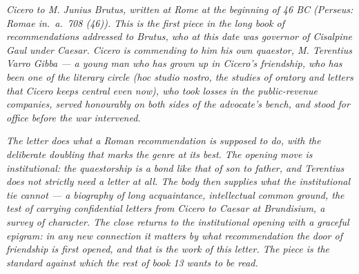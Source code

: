 
\textit{Cicero to M. Junius Brutus, written at Rome at the
beginning of 46 BC (Perseus: \textit{Romae in.~a.~708 (46)}).
This is the first piece in the long book of recommendations
addressed to Brutus, who at this date was governor of Cisalpine
Gaul under Caesar. Cicero is commending to him his own quaestor,
M. Terentius Varro Gibba --- a young man who has grown up in
Cicero's friendship, who has been one of the literary circle
(\textit{hoc studio nostro}, the studies of oratory and letters
that Cicero keeps central even now), who took losses in the
public-revenue companies, served honourably on both sides of the
advocate's bench, and stood for office before the war
intervened.}

\textit{The letter does what a Roman recommendation is supposed
to do, with the deliberate doubling that marks the genre at its
best. The opening move is institutional: the quaestorship is a
bond like that of son to father, and Terentius does not strictly
need a letter at all. The body then supplies what the
institutional tie cannot --- a biography of long acquaintance,
intellectual common ground, the test of carrying confidential
letters from Cicero to Caesar at Brundisium, a survey of
character. The close returns to the institutional opening with a
graceful epigram: in any new connection it matters by what
recommendation the door of friendship is first opened, and that
is the work of this letter. The piece is the standard against
which the rest of book 13 wants to be read.}
